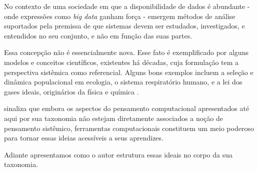 No contexto de uma sociedade em que a disponibilidade de dados é abundante - onde expressões como \textit{big data} ganham força - emergem métodos de análise suportados pela premissa de que sistemas devem ser estudados, investigados, e entendidos no seu conjunto, e não em função das suas partes.

Essa concepção não é essencialmente nova. Esse fato é exemplificado por alguns modelos e conceitos científicos, existentes há décadas, cuja formulação tem a perspectiva sistêmica como referencial. Alguns bons exemplos incluem a seleção e dinâmica populacional em ecologia, o sistema respiratório humano, e a lei dos gases ideais, originários da física e química \cite{Weintrop2016}.

 sinaliza que embora os aspectos do pensamento computacional apresentados até aqui por sua taxonomia não estejam diretamente associados a noção de pensamento sistêmico, ferramentas computacionais constituem um meio poderoso para tornar essas ideias acessíveis a seus aprendizes.

Adiante apresentamos como o autor estrutura essas ideais no corpo da sua taxonomia. 

